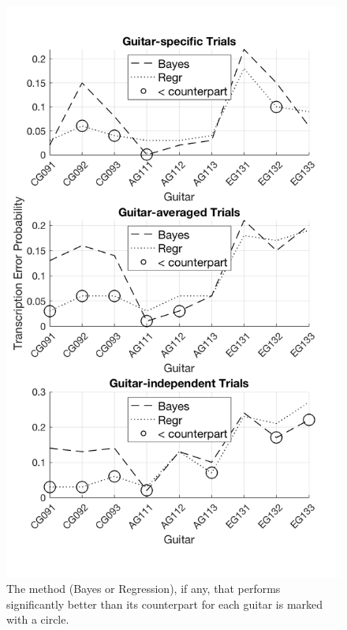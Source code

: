 \documentclass[convention,peer-reviewed]{aesconf}
\begin{document}
\begin{figure}[!htbp]
\centering
\includegraphics[scale=0.275]{novel-methods-sig-comp}
\caption{The method (Bayes or Regression), if any, that performs significantly better than its counterpart for each guitar is marked with a circle.}
\label{fig:novel-methods-sig-comp}
\end{figure}
\end{document}
